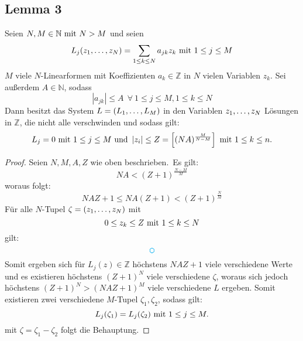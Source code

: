 
\subsection{Lemma 3}
    \label{subsec:lemma3}
    Seien $N, M \in \mathbb{N} \ \textrm{mit}\  N > M$ und seien
    \begin{equation*}
        L_j(z_1, \dots, z_N) = \sum_{1 \leq k \leq N} a_{jk} z_k \ \textrm{mit}\  1 \leq j \leq M
    \end{equation*}
    $M$ viele $N$-Linearformen mit Koeffizienten $a_k \in \mathbb{Z}$ in $N$ vielen Variablen $z_k$.
    \textrm{Sei außerdem} $A \in \mathbb{N}$, sodass
    \begin{equation*}
        \left| a_{jk} \right| \leq A \ \ \forall \ 1 \leq j \leq M, 1 \leq k \leq N
    \end{equation*}
    \textrm{Dann besitzt das System $L = (L_1, \dots, L_M)$ in den Variablen $z_1, \dots, z_N$ Lösungen in $\mathbb{Z}$, die nicht alle
    verschwinden und sodass gilt:}
    \begin{equation*}
        L_j = 0 \ \textrm{mit}\  1 \leq j \leq M \ \textrm{und}\  \left| z_i \right| \leq Z = \left[ (NA)^{\frac{M}{N-M}} \right]
        \ \textrm{mit}\  1 \leq k \leq n.
    \end{equation*}
    \begin{proof}
        Seien $N, M, A, Z$ wie oben beschrieben.\ Es gilt:
        \begin{equation*}
            NA < (Z + 1)^{\frac{N-M}{M}}
        \end{equation*}
        woraus folgt:
        \begin{equation*}
            NAZ+1 \leq NA(Z + 1) < (Z + 1)^{\frac{N}{M}}
        \end{equation*}
        \textrm{Für alle} $N$-Tupel $\zeta = (z_1, \dots, z_N)$ mit
        \begin{equation}
            0 \leq z_k \leq Z \ \textrm{mit}\  1 \leq k \leq N \label{eq:z_k-condition}
        \end{equation}
        gilt:
        \begin{equation*}
            \shine
        \end{equation*}
        \textrm{Somit ergeben sich für $L_j(z) \in \mathbb{Z}$ höchstens $NAZ+1$ viele verschiedene Werte und es existieren
        höchstens $(Z + 1)^N$ viele verschiedene $\zeta$, woraus sich jedoch höchstens $(Z + 1)^N > (NAZ+1)^M$ viele
        verschiedene $L$ ergeben.}
        \newline
        Somit existieren zwei verschiedene $M$-Tupel $\zeta_1, \zeta_2$, sodass gilt:
        \begin{equation*}
            L_j(\zeta_1) = L_j(\zeta_2) \ \textrm{mit}\  1 \leq j \leq M.
        \end{equation*}
        mit $\zeta = \zeta_1 - \zeta_2$ folgt die Behauptung.
    \end{proof}

